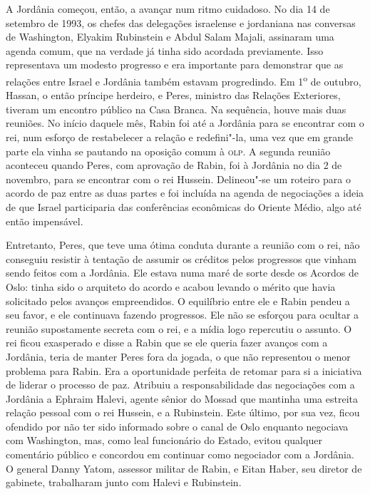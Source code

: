 A Jordânia começou, então, a avançar num ritmo cuidadoso. No dia 14 de
setembro de 1993, os chefes das delegações israelense e jordaniana nas
conversas de Washington, Elyakim Rubinstein e Abdul Salam Majali,
assinaram uma agenda comum, que na verdade já tinha sido acordada
previamente. Isso representava um modesto progresso e era
importante para demonstrar que as relações entre Israel e Jordânia
também estavam progredindo. Em 1\textsuperscript{o} de outubro, Hassan, o então príncipe
herdeiro, e Peres, ministro das Relações Exteriores, tiveram um encontro
público na Casa Branca. Na sequência, houve mais duas reuniões. No
início daquele mês, Rabin foi até a Jordânia para se encontrar com o rei,
num esforço de restabelecer a relação e redefini"-la, uma vez que em
grande parte ela vinha se pautando na oposição comum à \textsc{olp}. A segunda
reunião aconteceu quando Peres, com aprovação de Rabin, foi à Jordânia
no dia 2 de novembro, para se encontrar com o rei Hussein. Delineou"-se
um roteiro para o acordo de paz entre as duas partes e foi incluída na
agenda de negociações a ideia de que Israel participaria das
conferências econômicas do Oriente Médio, algo até então impensável.

Entretanto, Peres, que teve uma ótima conduta durante a reunião com o rei,
não conseguiu resistir à tentação de assumir os créditos pelos
progressos que vinham sendo feitos com a Jordânia. Ele estava numa maré
de sorte desde os Acordos de Oslo: tinha sido o arquiteto do acordo e
acabou levando o mérito que havia solicitado pelos avanços empreendidos.
O equilíbrio entre ele e Rabin pendeu a seu favor, e ele continuava
fazendo progressos. Ele não se esforçou para ocultar a reunião
supostamente secreta com o rei, e a mídia logo repercutiu o assunto. O
rei ficou exasperado e disse a Rabin que se ele queria fazer avanços com
a Jordânia, teria de manter Peres fora da jogada, o que não representou o menor
problema para Rabin. Era a oportunidade perfeita de retomar para si a
iniciativa de liderar o processo de paz. Atribuiu a responsabilidade das
negociações com a Jordânia a Ephraim Halevi, agente sênior do Mossad que
mantinha uma estreita relação pessoal com o rei Hussein, e a Rubinstein.
Este último, por sua vez, ficou ofendido por não ter sido informado sobre o canal de
Oslo enquanto negociava com Washington, mas, como leal funcionário do
Estado, evitou qualquer comentário público e concordou em continuar como
negociador com a Jordânia. O general Danny Yatom, assessor militar de
Rabin, e Eitan Haber, seu diretor de gabinete, trabalharam junto com
Halevi e Rubinstein.

